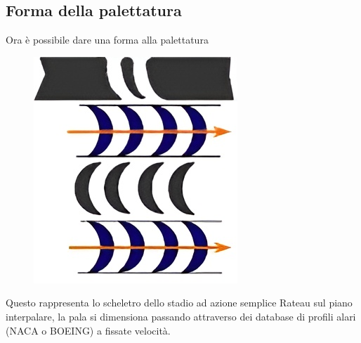 \documentclass[a4paper, 15pt]{article}
\begin{document}
\subsection{Forma della palettatura}
\begin{adjustwidth}{2in}{}
	Ora è possibile dare una forma alla palettatura
\begin{figure}[H]
	\centering
	\includegraphics[width=0.4\linewidth]{immagini/Rat1}
	\label{fig:rat1}
\end{figure}
	Questo rappresenta lo scheletro dello stadio ad azione semplice Rateau sul piano interpalare, la pala si dimensiona passando attraverso dei database di profili alari (NACA o BOEING) a fissate velocità. \newline
	

\end{adjustwidth}
\end{document}
